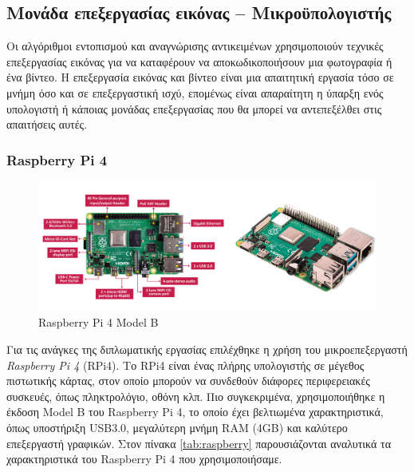 \subsection{Μονάδα επεξεργασίας εικόνας – Μικροϋπολογιστής}
Οι αλγόριθμοι εντοπισμού και αναγνώρισης αντικειμένων χρησιμοποιούν τεχνικές επεξεργασίας εικόνας για να καταφέρουν να αποκωδικοποιήσουν μια φωτογραφία ή ένα βίντεο. Η επεξεργασία εικόνας και βίντεο είναι μια απαιτητική εργασία τόσο σε μνήμη όσο και σε επεξεργαστική ισχύ, επομένως είναι απαραίτητη η ύπαρξη ενός υπολογιστή ή κάποιας μονάδας επεξεργασίας που θα μπορεί να αντεπεξέλθει στις απαιτήσεις αυτές.

\subsubsection{Raspberry Pi 4}
\begin{figure}[H]
    \centering
    \includegraphics[width=\textwidth]{images/raspberry.png}
    \caption{Raspberry Pi 4 Model B}
    \label{fig:RPi4modelB}
\end{figure}
Για τις ανάγκες της διπλωματικής εργασίας επιλέχθηκε η χρήση του μικροεπεξεργαστή \emph{Raspberry Pi 4} (RPi4). Το RPi4 είναι ένας πλήρης υπολογιστής σε μέγεθος πιστωτικής κάρτας, στον οποίο μπορούν να συνδεθούν διάφορες περιφερειακές συσκευές, όπως πληκτρολόγιο, οθόνη κλπ. Πιο συγκεκριμένα, χρησιμοποιήθηκε η έκδοση Model B του Raspberry Pi 4, το οποίο έχει βελτιωμένα χαρακτηριστικά, όπως υποστήριξη USB3.0, μεγαλύτερη μνήμη RAM (4GB) και καλύτερο επεξεργαστή γραφικών. Στον πίνακα \ref{tab:raspberry} παρουσιάζονται αναλυτικά τα χαρακτηριστικά του Raspberry Pi 4 που χρησιμοποιήσαμε.

